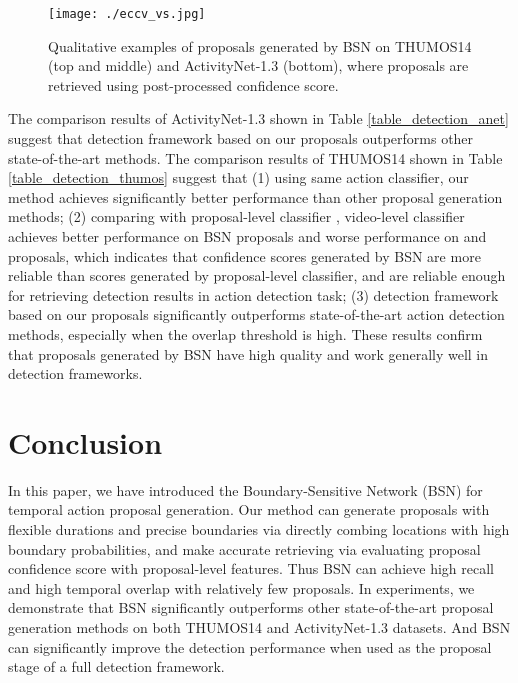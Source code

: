 \documentclass[runningheads]{llncs}
\begin{document}
\begin{figure}[t]
\setlength{\abovecaptionskip}{-0.3cm} \setlength{\belowcaptionskip}{-0.3cm} \begin{center}
\begin{minipage}[b]{1.0\linewidth}
  \centering
  \centerline{\texttt{[image: ./eccv\_vs.jpg]}}
\medskip
\end{minipage}
\end{center}
   \caption{Qualitative examples of proposals generated by BSN on THUMOS14 (top and middle) and ActivityNet-1.3 (bottom), where proposals are retrieved using  post-processed confidence score. }
\label{fig_vs}
\vspace{-0.2cm}
\end{figure}

The comparison results of ActivityNet-1.3 shown in Table \ref{table_detection_anet} suggest that  detection framework based on our proposals outperforms other state-of-the-art methods.
The comparison results of THUMOS14 shown in Table \ref{table_detection_thumos} suggest that 
(1) using same action classifier, our method achieves significantly better performance than other proposal generation methods;
(2) comparing  with  proposal-level classifier \cite{shou2016action}, video-level classifier \cite{wang2017untrimmednets} achieves better performance on BSN proposals and worse performance  on \cite{sst_buch_cvpr17} and \cite{gao2017turn} proposals, which indicates that confidence scores generated by BSN are more reliable than scores generated by proposal-level classifier, and are reliable enough for retrieving detection results in action detection task;
(3) detection framework based on our proposals significantly outperforms  state-of-the-art action detection methods, especially when the overlap threshold is high. 
These results confirm that proposals generated by BSN have high quality and work generally well in detection frameworks. 













\section{Conclusion}

In this paper, we have introduced the Boundary-Sensitive Network (BSN) for temporal action proposal generation. Our method can generate proposals with flexible durations and precise boundaries via directly combing locations with high boundary probabilities, and make accurate  retrieving via evaluating proposal confidence score with proposal-level features. Thus BSN can achieve high recall and high temporal overlap with relatively few proposals.
In experiments, we demonstrate that BSN significantly outperforms other state-of-the-art proposal generation methods on both THUMOS14 and ActivityNet-1.3 datasets. And BSN can significantly improve  the detection performance when used as the proposal stage of a full detection framework.



\newpage



\end{document}

